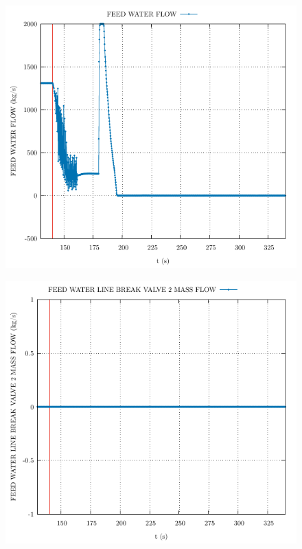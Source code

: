 \documentclass{article}
\begin{document}
\begin{multicols}{2}
\begin{figure}[H]
\end{figure}
\begin{figure}[H]
\centering
\includegraphics[width=\linewidth]{./graphs/FEED WATER FLOW_comp.pdf}
\end{figure}
\begin{figure}[H]
\centering
\includegraphics[width=\linewidth]{./graphs/FEED WATER LINE BREAK VALVE 2 MASS FLOW_comp.pdf}

\end{figure}
\end{multicols}
\end{document}
